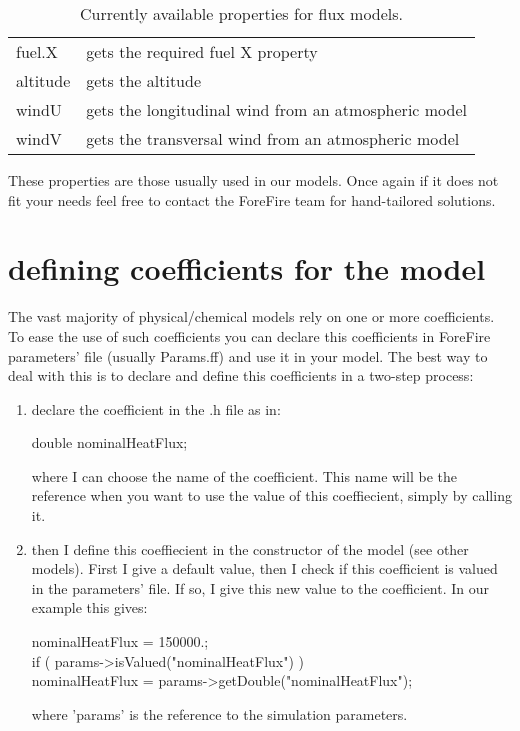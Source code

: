 \begin{table}[htbp]
   	\begin{center}
   	\begin{tabular}{|l|l|}
		\hline
		fuel.X & gets the required fuel X property \\
		altitude & gets the altitude \\
		windU & gets the longitudinal wind from an atmospheric model \\
		windV & gets the transversal wind from an atmospheric model \\
		\hline
	\end{tabular}
    \caption{Currently available properties for flux models. \label{fluxprops}}
   	\end{center}
\end{table}

These properties are those usually used in our models. Once again if it does not fit your needs feel free to contact the ForeFire team for hand-tailored solutions.

\section{defining coefficients for the model}

The vast majority of physical/chemical models rely on one or more coefficients. To ease the use of such coefficients you can declare this coefficients in ForeFire parameters' file (usually Params.ff) and use it in your model. The best way to deal with this is to declare and define this coefficients in a two-step process:
\begin{enumerate}
\item declare the coefficient in the .h file as in: \\ \begin{center} double nominalHeatFlux; \end{center}
where I can choose the name of the coefficient. This name will be the reference when you want to use the value of this coeffiecient, simply by calling it.
\item then I define this coeffiecient  in the constructor of the model (see other models). First I give a default value, then I check if this coefficient is valued in the parameters' file. If so, I give this new value to the coefficient. In our example this gives: \\ \begin{center} 	nominalHeatFlux = 150000.;\\
if ( params->isValued("nominalHeatFlux") )\\ nominalHeatFlux = params->getDouble("nominalHeatFlux"); \end{center} where 'params' is the reference to the simulation parameters.
\end{enumerate}

